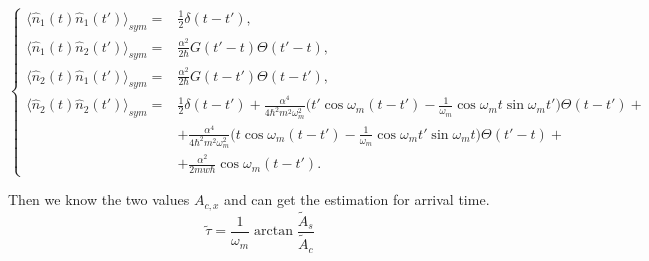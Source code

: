 \documentclass[notitlepage,a4paper,11pt,hyperref=pdftex]{revtex4-1}
\newcommand{\means}[1]{\langle#1\rangle_{sym}}
\begin{document}
\begin{equation}\label{noises}
 \begin{cases}
  \means{\hat{n}_1(t)\hat{n}_1(t')}=&\frac{1}{2}\delta(t-t'),\\
  \means{\hat{n}_1(t)\hat{n}_2(t')}=&\frac{\alpha^2}{2\hbar}G(t'-t)\Theta(t'-t),\\
  \means{\hat{n}_2(t)\hat{n}_1(t')}=&\frac{\alpha^2}{2\hbar}G(t-t')\Theta(t-t'),\\
  \means{\hat{n}_2(t)\hat{n}_2(t')}=&\frac{1}{2}\delta(t-t')+\frac{\alpha^4}{4\hbar^2 m^2 \omega_m^2}\bigl(t'\cos\omega_m(t-t')-\frac{1}{\omega_m}\cos\omega_mt\sin\omega_mt'\bigr)\Theta(t-t')+\\
&+\frac{\alpha^4}{4\hbar^2 m^2 \omega_m^2}\bigl(t\cos\omega_m(t-t')-\frac{1}{\omega_m}\cos\omega_mt'\sin\omega_mt\bigr)\Theta(t'-t)+\\&+ \frac{\alpha^2}{2 m w \hbar}\cos\omega_m(t-t').
 \end{cases}
\end{equation}

Then we know the two values $A_{c,x}$ and can get the estimation for arrival time.
\begin{equation}
 \tilde{\tau} = \frac{1}{\omega_m}\arctan \frac{\tilde{A}_s}{\tilde{A}_c}
\end{equation}
\end{document}
